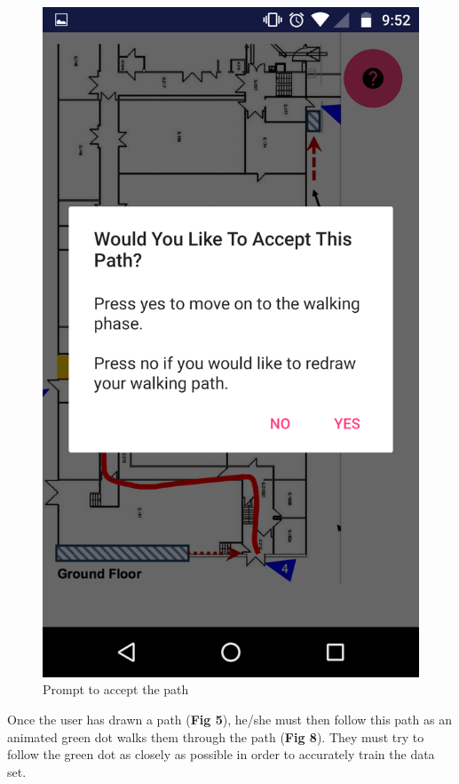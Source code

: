 \documentclass[10.8pt]{article}
\begin{document}
\begin{figure}[H]
\begin{minipage}[b]{.3\textwidth}
        \includegraphics[scale=1.2, width=\linewidth]{pic5.png}  
        \caption{Prompt to accept the path}  
    \end{minipage}  
\end{figure}

Once the user has drawn a path (\textbf{Fig 5}), he/she must then follow this path as an animated green dot walks them through the path (\textbf{Fig 8}). They must try to follow the green dot as closely as possible in order to accurately train the data set.
\end{document}
